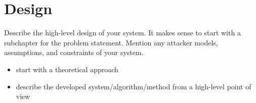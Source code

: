 \chapter{Design}

Describe the high-level design of your system.
It makes sense to start with a subchapter for the problem statement.
Mention any attacker models, assumptions, and constraints of your system.

\begin{itemize}
    \item start with a theoretical approach
    \item describe the developed system/algorithm/method from a high-level point of view
\end{itemize}
